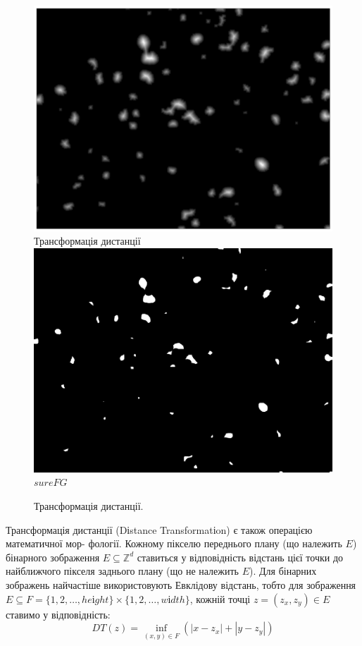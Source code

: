 \begin{figure}[t!]
	\centering	
	\includegraphics[width=0.95\linewidth]{Figures/Chapter2/4a.png}
	Трансформація дистанції
	\endminipage\hfill
	\centering	
	\includegraphics[width=0.95\linewidth]{Figures/Chapter2/4b.png}
	\(sureFG\)
	\endminipage\hfill
	
	\caption{Трансформація дистанції.}
	\label{fig:dist_transform}
\end{figure}

Трансформація дистанції (Dіstance Transformatіon) є також операцією математичної мор- фології. Кожному пікселю переднього плану (що належить \(E\)) бінарного зображення \(E \subseteq \mathbb{Z}^d\) ставиться у відповідність відстань цієї точки до найближчого пікселя заднього плану (що не належить \(E\)). Для бінарних зображень найчастіше використовують Евклідову відстань, тобто для зображення \(E \subseteq F = \{1, 2, \dots, heіght\} \times \{1, 2, \dots, wіdth\}\), кожній точці \(z = (z_x, z_y) \in E\) ставимо у відповідність:
\begin{equation*}
DT(z) = \inf_{(x, y) \in F}{(|x - z_x| + |y - z_y|)}
\end{equation*}

